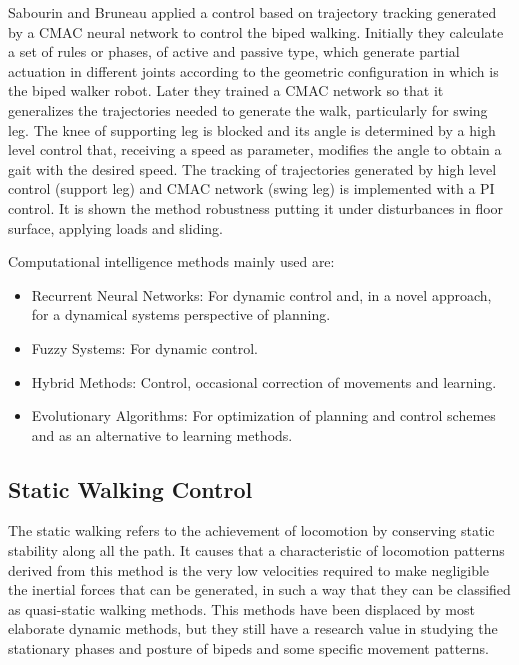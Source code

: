 Sabourin and Bruneau \cite{Sabourin05Robustness} applied a control based on trajectory tracking generated by a CMAC neural network to control the biped walking. Initially they calculate a set of rules or phases, of active and passive type, which generate partial actuation in different joints according to the geometric configuration in which is the biped walker robot. Later they trained a CMAC network so that it generalizes the trajectories needed to generate the walk, particularly for swing leg. The knee of supporting leg is blocked and its angle is determined by a high level control that, receiving a speed as parameter, modifies the angle to obtain a gait with the desired speed. The tracking of trajectories generated by high level control (support leg) and CMAC network (swing leg) is implemented with a PI control. It is shown the method robustness putting it under disturbances in floor surface, applying loads and sliding.

Computational intelligence methods mainly used are:
\begin{itemize}
\item Recurrent Neural Networks: For dynamic control and, in a novel approach, for a dynamical systems perspective of planning.
\item Fuzzy Systems: For dynamic control.
\item Hybrid Methods: Control, occasional correction of movements and learning.
\item Evolutionary Algorithms: For optimization of planning and control schemes and as an alternative to learning methods.
\end{itemize}

\subsection{Static Walking Control}
The static walking refers to the achievement of locomotion by conserving static stability along all the path. It causes that a characteristic of locomotion patterns derived from this method is the very low velocities required to make negligible the inertial forces that can be generated, in such a way that they can be classified as quasi-static walking methods. This methods have been displaced by most elaborate dynamic methods, but they still have a research value in studying the stationary phases and posture of bipeds and some specific movement patterns.


